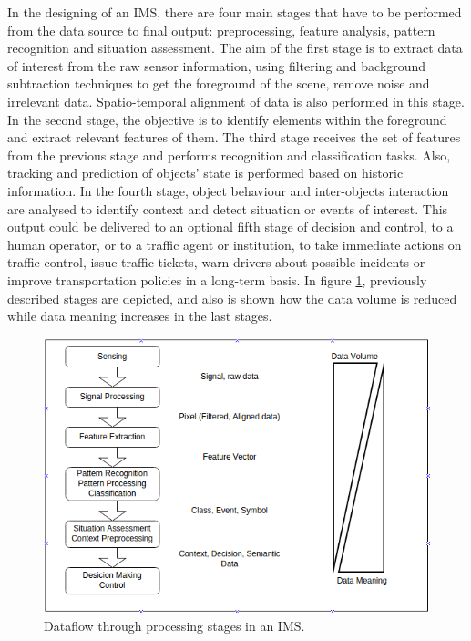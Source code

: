 In the designing of an IMS, there are four main stages that have to be performed from the data source to final output: preprocessing, feature analysis, pattern recognition and situation assessment. The aim of the first stage is to extract data of interest from the raw sensor information, using filtering and background subtraction techniques to get the foreground of the scene, remove noise and irrelevant data. Spatio-temporal alignment of data is also performed in this stage. In the second stage, the objective is to identify elements within the foreground and extract relevant features of them. The third stage receives the set of features from the previous stage and performs recognition and classification tasks. Also, tracking and prediction of objects' state is performed based on historic information. In the fourth stage, object behaviour and inter-objects interaction are analysed to identify context and detect situation or events of interest. This output could be delivered to an optional fifth stage of decision and control, to a human operator, or to a traffic agent or institution, to take immediate actions on traffic control, issue traffic tickets, warn drivers about possible incidents or improve transportation policies in a long-term basis. In figure \ref{proc_stages}, previously described stages are depicted, and also is shown how the data volume is reduced while data meaning increases in the last stages.

\begin{figure}[ht!]
\centering
\includegraphics[scale=0.55]{fig/3/proc_stages.png}
\caption{Dataflow through processing stages in an IMS.}
\label{proc_stages}
\end{figure}


